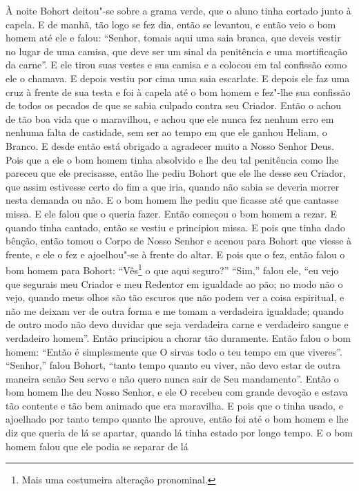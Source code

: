 À noite Bohort deitou"-se sobre a grama verde, que o aluno tinha cortado junto à
capela. E de manhã, tão logo se fez dia, então se levantou, e então veio o bom
homem até ele e falou: “Senhor, tomais aqui uma saia branca, que deveis vestir
no lugar de uma camisa, que deve ser um sinal da penitência e uma mortificação
da carne”. E ele tirou suas vestes e sua camisa e a colocou em tal
confissão como ele o chamava. E depois vestiu por cima uma saia escarlate. E
depois ele faz uma cruz à frente de sua testa e foi à capela até o bom homem e
fez"-lhe sua confissão de todos os pecados de que se sabia culpado contra seu
Criador. Então o achou de tão boa vida que o maravilhou, e achou que ele nunca
fez nenhum erro em nenhuma falta de castidade, sem ser ao tempo em que ele
ganhou Heliam, o Branco. E desde então está obrigado a agradecer muito a Nosso
Senhor Deus. Pois que a ele o bom homem tinha absolvido e lhe deu tal
penitência como lhe pareceu que ele precisasse, então lhe pediu Bohort que ele
lhe desse seu Criador, que assim estivesse certo do fim a que iria, quando não
sabia se deveria morrer nesta demanda ou não. E o bom homem lhe pediu que
ficasse até que cantasse missa. E ele falou que o queria fazer. Então começou o
bom homem a rezar. E quando tinha cantado, então se vestiu e principiou missa.
E pois que tinha dado bênção, então tomou o Corpo de Nosso Senhor e acenou para
Bohort que viesse à frente, e ele o fez e ajoelhou"-se à frente do altar. E pois
que o fez, então falou o bom homem para Bohort: “Vês\footnote{ Mais uma
costumeira alteração pronominal.}  o que aqui seguro?” “Sim,”
falou ele, “eu vejo que segurais meu Criador e meu Redentor em igualdade ao
pão; no modo não o vejo, quando meus olhos são tão escuros que não podem ver a
coisa espiritual, e não me deixam ver de outra forma e me tomam a verdadeira
igualdade; quando de outro modo não devo duvidar que seja verdadeira carne e
verdadeiro sangue e verdadeiro homem”. Então principiou a chorar tão
duramente. Então falou o bom homem: “Então é simplesmente que O sirvas todo o
teu tempo em que viveres”. “Senhor,” falou Bohort, ``tanto tempo quanto eu viver,
não devo estar de outra maneira senão Seu servo e não quero nunca sair de Seu
mandamento”. Então o bom homem lhe deu Nosso Senhor, e ele O recebeu
com grande devoção e estava tão contente e tão bem animado que era maravilha. E
pois que o tinha usado, e ajoelhado por tanto tempo quanto lhe aprouve, então
foi até o bom homem e lhe diz que queria de lá se apartar, quando lá tinha
estado por longo tempo. E o bom homem falou que ele podia se separar de lá
